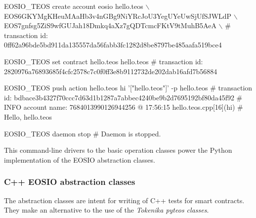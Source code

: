 \begin{DoxyCode}
$ $EOSIO\_TEOS create account eosio hello.teos \(\backslash\)
  EOS6GKYMgKHeuMAaHb3v4nGBg9NiYRcJoU3YegUYeUwSjUfSJWLdP \(\backslash\)
    EOS7gnfsg5ZiS9wfGUJah18Dmkq4aXz7gQDTcmcFKtV9tMuhB5AeA \(\backslash\)
#   transaction id: 
  0ff62a96bde5bd911da135557da56fabb3fc1282d8be8797be485aafa519bce4

$ $EOSIO\_TEOS set contract hello.teos hello.teos
#   transaction id: 
  2820976a76893685f4cfc2578c7c0f0ff3e8b9112732de202dab16afd7b56884

$ $EOSIO\_TEOS push action hello.teos hi '["hello.teos"]' -p hello.teos
#   transaction id: 
  bdbace3b4327f70ccc7d63d1b1287a7abbec4240be9b2d7695192bf80da45f92
#  INFO account name: 7684013990126944256  @ 17:56:15 hello.teos.cpp[16](hi)
#  Hello, hello.teos

$ $EOSIO\_TEOS daemon stop
#  Daemon is stopped.
\end{DoxyCode}


This command-\/line drivers to the basic operation classes power the Python implementation of the E\+O\+S\+IO abstraction classes.

\subsubsection*{C++ E\+O\+S\+IO abstraction classes}

The abstraction classes are intent for writing of C++ tests for smart contracts. They make an alternative to the use of the {\itshape Tokenika pyteos classes}. 